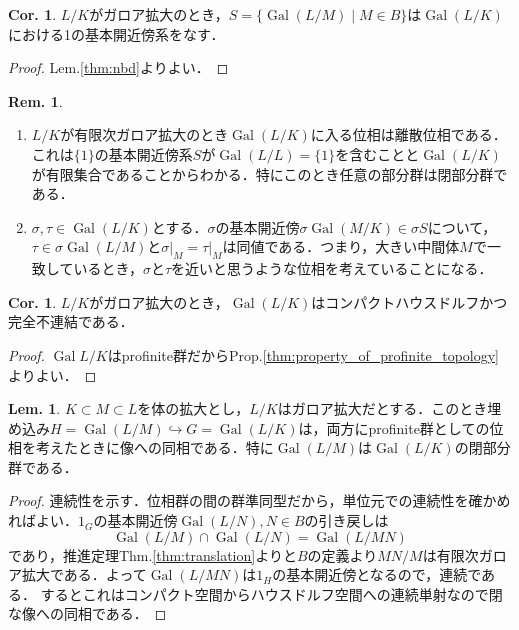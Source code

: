 \documentclass[dvipdfmx,b5paper,papersize]{jsarticle}
\theoremstyle{definition}
\newtheorem{cor}[thm]{Cor.}
\newtheorem{lem}[thm]{Lem.}
\newtheorem{rem}[thm]{Rem.}
\DeclareMathOperator{\Gal}{Gal}
\begin{document}
\begin{cor}\label{thm:gal_nbd}
  $L/K$がガロア拡大のとき，$S=\{\Gal(L/M) \mid M \in B\}$は$\Gal(L/K)$における1の基本開近傍系をなす．
\end{cor}
\begin{proof}
  Lem.\ref{thm:nbd}よりよい．
\end{proof}
\begin{rem}\label{thm:finite_discrete_remark}
  \begin{enumerate}
    \item $L/K$が有限次ガロア拡大のとき$\Gal(L/K)$に入る位相は離散位相である．これは$\{1\}$の基本開近傍系$S$が$\Gal(L/L)=\{1\}$を含むことと$\Gal(L/K)$が有限集合であることからわかる．特にこのとき任意の部分群は閉部分群である．
    \item $\sigma, \tau \in \Gal(L/K)$とする．$\sigma$の基本開近傍$\sigma \Gal(M/K) \in \sigma S$について，$\tau \in \sigma \Gal(L/M)$と$\sigma \lvert_M = \tau \lvert_M$は同値である．つまり，大きい中間体$M$で一致しているとき，$\sigma$と$\tau$を近いと思うような位相を考えていることになる．
  \end{enumerate}
\end{rem}

\begin{cor}
  $L/K$がガロア拡大のとき，$\Gal(L/K)$はコンパクトハウスドルフかつ完全不連結である．
\end{cor}
\begin{proof}
  $\Gal{L/K}$はprofinite群だからProp.\ref{thm:property_of_profinite_topology}よりよい．
\end{proof}

\begin{lem}\label{thm:inclusion_conti}
  $K \subset M \subset L$を体の拡大とし，$L/K$はガロア拡大だとする．このとき埋め込み$H=\Gal(L/M) \hookrightarrow G=\Gal(L/K)$は，両方にprofinite群としての位相を考えたときに像への同相である．特に$\Gal(L/M)$は$\Gal(L/K)$の閉部分群である．
\end{lem}
\begin{proof}
  連続性を示す．位相群の間の群準同型だから，単位元での連続性を確かめればよい．$1_G$の基本開近傍$\Gal(L/N), N \in B$の引き戻しは
  \[
  \Gal(L/M) \cap \Gal(L/N) =\Gal(L/MN)
  \]
  であり，推進定理Thm.\ref{thm:translation}よりと$B$の定義より$MN/M$は有限次ガロア拡大である．よって$\Gal(L/MN)$は$1_H$の基本開近傍となるので，連続である．
  するとこれはコンパクト空間からハウスドルフ空間への連続単射なので閉な像への同相である．
\end{proof}
\end{document}
